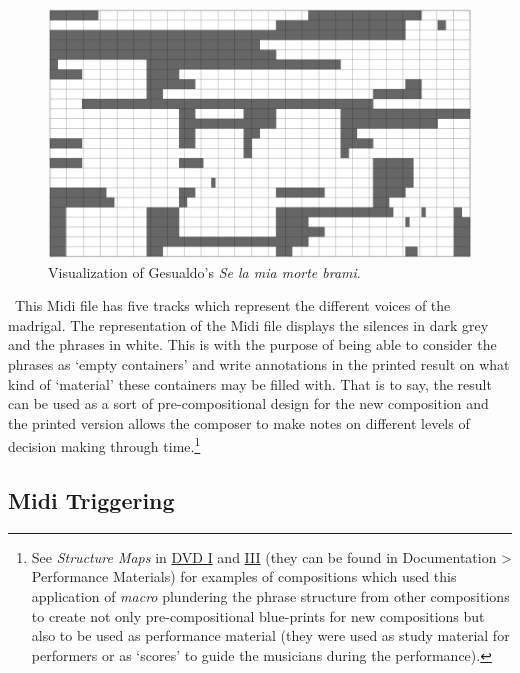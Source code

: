 \begin{figure}[htbp] %
   \centering
   \includegraphics[width=16cm]{chapter5/midi_gesualdo.tif} %
   \caption{Visualization of Gesualdo's \emph{Se la mia morte brami}.}
   \label{fig:example}
\end{figure}\
This Midi file has five tracks which represent the different voices of the madrigal. The representation of the Midi file displays the silences in dark grey and the phrases in white. This is with the purpose of being able to consider the phrases as `empty containers' and write annotations in the printed result on what kind of `material' these containers may be filled with. That is to say, the result can be used as a sort of pre-compositional design for the new composition and the printed version allows the composer to make notes on different levels of decision making through time.\footnote{See \emph{Structure Maps} in \href{http://phd.federicoreuben.com/etudes/}{DVD I} and \href{http://phd.federicoreuben.com/zizek/}{III} (they can be found in Documentation \tiny \textgreater \footnotesize \hspace{0pt} Performance Materials) for examples of compositions which used this application of \emph{macro} plundering the phrase structure from other compositions to create not only pre-compositional blue-prints for new compositions but also to be used as performance material (they were used as study material for performers or as `scores' to guide the musicians during the performance).}

\subsection{Midi Triggering}

